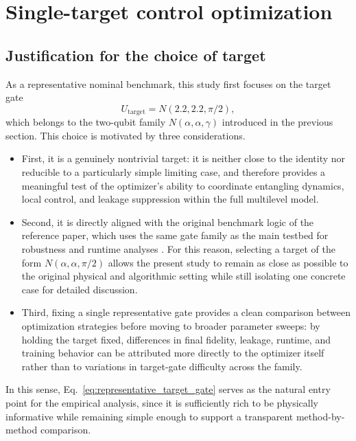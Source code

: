
\section{Single-target control optimization}
\label{sec:single_target_optimization}
\subsection{Justification for the choice of target}
\label{subsec:why_this_target_is_representative}

As a representative nominal benchmark, this study first focuses on the target gate
\begin{equation}
U_{\mathrm{target}}
=
N(2.2,2.2,\pi/2),
\label{eq:representative_target_gate}
\end{equation}
which belongs to the two-qubit family \(N(\alpha,\alpha,\gamma)\) introduced in the previous section. This choice is motivated by three considerations.
\begin{itemize}
    \item First, it is a genuinely nontrivial target: it is neither close to the identity nor reducible to a particularly simple limiting case, and therefore provides a meaningful test of the optimizer's ability to coordinate entangling dynamics, local control, and leakage suppression within the full multilevel model.
    \item Second, it is directly aligned with the original benchmark logic of the reference paper, which uses the same gate family as the main testbed for robustness and runtime analyses \cite{Niu2019}. For this reason, selecting a target of the form \(N(\alpha,\alpha,\pi/2)\) allows the present study to remain as close as possible to the original physical and algorithmic setting while still isolating one concrete case for detailed discussion.
    \item Third, fixing a single representative gate provides a clean comparison between optimization strategies before moving to broader parameter sweeps: by holding the target fixed, differences in final fidelity, leakage, runtime, and training behavior can be attributed more directly to the optimizer itself rather than to variations in target-gate difficulty across the family.
\end{itemize}
In this sense, Eq.~\eqref{eq:representative_target_gate} serves as the natural entry point for the empirical analysis, since it is sufficiently rich to be physically informative while remaining simple enough to support a transparent method-by-method comparison.

